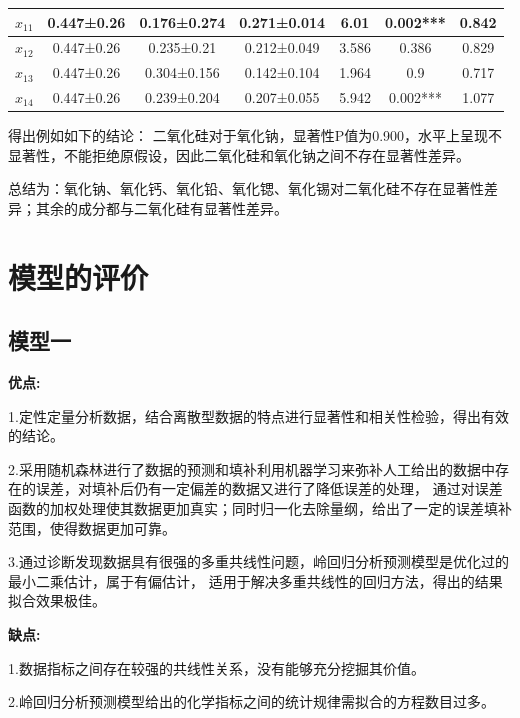\documentclass[UTF8]{ctexart}
\begin{document}
\begin{table}[H]
\begin{tabular}{|c|c|c|c|c|c|c|}
        $x_{11}$                  & 0.447±0.26                          & 0.176±0.274             & 0.271±0.014             & 6.01                       & 0.002*** & 0.842 \\ \hline
        $x_{12}$                  & 0.447±0.26                          & 0.235±0.21              & 0.212±0.049             & 3.586                      & 0.386    & 0.829 \\ \hline
        $x_{13}$                  & 0.447±0.26                          & 0.304±0.156             & 0.142±0.104             & 1.964                      & 0.9      & 0.717 \\ \hline
        $x_{14}$                  & 0.447±0.26                          & 0.239±0.204             & 0.207±0.055             & 5.942                      & 0.002*** & 1.077 \\ \hline
    \end{tabular}
\end{table}
得出例如如下的结论：
二氧化硅对于氧化钠，显著性P值为0.900，水平上呈现不显著性，不能拒绝原假设，因此二氧化硅和氧化钠之间不存在显著性差异。

总结为：氧化钠、氧化钙、氧化铅、氧化锶、氧化锡对二氧化硅不存在显著性差异；其余的成分都与二氧化硅有显著性差异。
\section{模型的评价}
\subsection{模型一}
\noindent \textbf{优点:}

1.定性定量分析数据，结合离散型数据的特点进行显著性和相关性检验，得出有效的结论。

2.采用随机森林进行了数据的预测和填补利用机器学习来弥补人工给出的数据中存在的误差，对填补后仍有一定偏差的数据又进行了降低误差的处理，
通过对误差函数的加权处理使其数据更加真实；同时归一化去除量纲，给出了一定的误差填补范围，使得数据更加可靠。

3.通过诊断发现数据具有很强的多重共线性问题，岭回归分析预测模型是优化过的最小二乘估计，属于有偏估计，
适用于解决多重共线性的回归方法，得出的结果拟合效果极佳。


\noindent \textbf{缺点:}

1.数据指标之间存在较强的共线性关系，没有能够充分挖掘其价值。

2.岭回归分析预测模型给出的化学指标之间的统计规律需拟合的方程数目过多。
\end{document}
